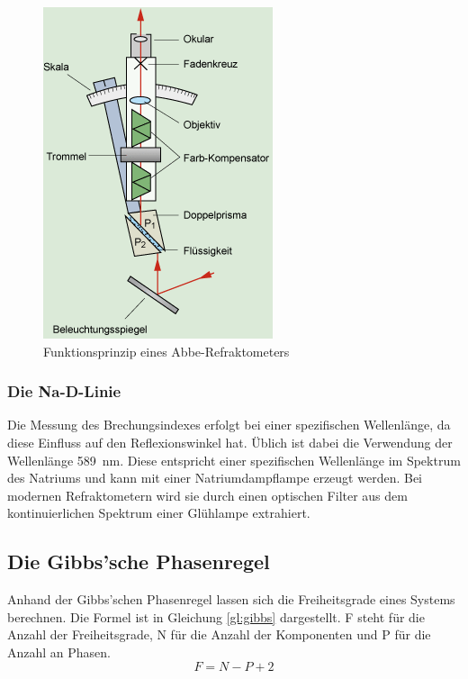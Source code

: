 \begin{figure}[h!]
	\centering
	\includegraphics[width=0.7\linewidth]{img/refraktometer}
	\caption{Funktionsprinzip eines Abbe-Refraktometers \cite{refraktometer}}
	\label{fig:refraktometer}
\end{figure}

\subsubsection*{Die Na-D-Linie}

Die Messung des Brechungsindexes erfolgt bei einer spezifischen Wellenlänge, da diese Einfluss auf den Reflexionswinkel hat. Üblich ist dabei die Verwendung der  Wellenlänge  \SI{589}{\nano\meter}. Diese entspricht einer spezifischen Wellenlänge im Spektrum des Natriums und kann mit einer Natriumdampflampe erzeugt werden. Bei modernen Refraktometern wird sie durch einen optischen Filter aus dem kontinuierlichen Spektrum einer Glühlampe extrahiert.
\FloatBarrier
\subsection{Die Gibbs'sche Phasenregel}
Anhand der Gibbs'schen Phasenregel lassen sich die Freiheitsgrade eines Systems berechnen. Die Formel ist in Gleichung \eqref{gl:gibbs} dargestellt. F steht für die Anzahl der Freiheitsgrade, N für die Anzahl der Komponenten und P für die Anzahl an Phasen.
\vspace{-2mm}
\begin{equation}\label{gl:gibbs}
F=N-P+2
\end{equation}
